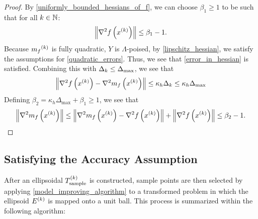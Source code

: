 \begin{proof}
By \cref{uniformly_bounded_hessians_of_f}, we can choose $\beta_1 \ge 1$ to be such that for all $k \in\mathbb N$:
\begin{align*}
\left\|\nabla^2 f\left(x^{(k)}\right) \right\| \le \beta_1 - 1.
\end{align*}
Because ${{m}_f}^{(k)}$ is fully quadratic, $Y$ is $\Lambda$-poised, by \cref{lipschitz_hessian}, we satisfy the assumptions for \cref{quadratic_errors}.
Thus, we see that \cref{error_in_hessian} is satisfied.
Combining this with $\Delta_k \le {\Delta_{\textrm{max}}}$, we see that
\begin{align*}
\left\|\nabla^2 f\left(x^{(k)}\right) - \nabla^2 m_f\left(x^{(k)}\right) \right\| \le \kappa_{h} \Delta_k \le \kappa_{h} \Delta_{\text{max}}
\end{align*}
Defining $\beta_2 = \kappa_{h} \Delta_{\text{max}} + \beta_1 \ge 1$, we see that
\begin{align*}
\left\|\nabla^2 m_{f}\left(x^{(k)}\right)\right\| \le \left\|\nabla^2 m_{f}\left(x^{(k)}\right) - \nabla^2 f\left(x^{(k)}\right)  \right\| + \left\|\nabla^2 f\left(x^{(k)}\right) \right\|
\le \beta_2 - 1 .
\end{align*}
\end{proof}



\subsection{Satisfying the Accuracy Assumption}
\label{satisfying_accuracy}

After an ellipsoidal ${T_{\text{sample}}^{(k)}}$ is constructed,  sample points are then selected by applying  \cref{model_improving_algorithm} 
to a transformed problem in which the ellipsoid ${E^{(k)}}$ is mapped onto a unit ball.
This process is summarized within the following algorithm:

